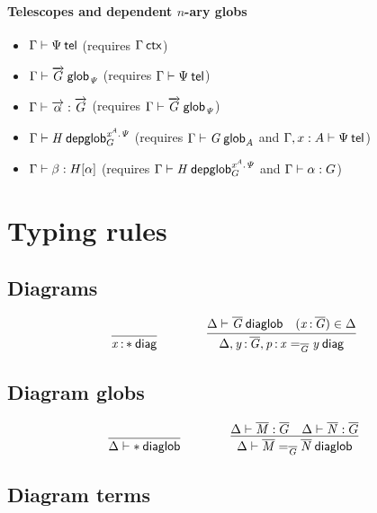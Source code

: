 \paragraph{Telescopes and dependent $n$-ary globs}

\begin{itemize}
\item $\wftel{\Gamma}{\Psi}$ (requires $\wfctx{\Gamma}$)
\item $\wfglob{\Gamma}{\tel{G}}{}{\Psi}$ (requires $\wftel{\Gamma}{\Psi}$)
\item $\ofglob{\Gamma}{\tel\alpha}{\tel{G}}$ (requires
  $\wfglob{\Gamma}{\tel{G}}{}{\Psi}$)
\item $\wfdepglob{\Gamma}{H}{}{x^A.\Psi}{G}$ (requires $\wfglob{\Gamma}{G}{}{A}$
  and $\wftel{\Gamma,x:A}{\Psi}$)
\item $\ofdepglob{\Gamma}{\beta}{H}{\alpha}$ (requires
  $\wfdepglob{\Gamma}{H}{}{x^A.\Psi}{G}$ and $\ofglob{\Gamma}{\alpha}{G}$)
\end{itemize}

\section{Typing rules}

\subsection{Diagrams}

\begin{small}
  \[
  \infer{\wfdiag{\tptm{x}{\diagbase}}}{}
  \qquad\qquad
  \infer{\wfdiag{\Delta,\tptm{y}{\diag G},\tptm{p}{\homj{\diag{G}}{x}{y}}}}
  {\wfdiaglob{\Delta}{\diag G}
    & (\tptm{x}{\diag{G}}) \in \Delta}\]
\end{small}

\subsection{Diagram globs}

\begin{small}
  \[
  \infer{\wfdiaglob{\Delta}{\diagbase}}
  {}%
  \qquad\qquad
  \infer{\wfdiaglob{\Delta}{\homj{\diag G}{\diag M}{\diag N}}}
  {\ofdiaglob{\Delta}{\diag M}{\diag G}
    & \ofdiaglob{\Delta}{\diag N}{\diag G}}
  \]
\end{small}

\subsection{Diagram terms}

